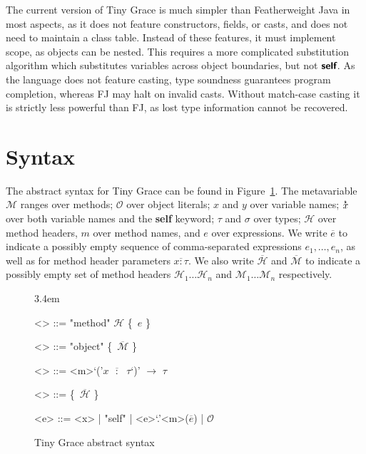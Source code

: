 \documentclass[a4paper, 11pt]{article}
\def\H{\mathcal{H}}
\def\M{\mathcal{M}}
\def\O{\mathcal{O}}
\def\bo{{\sffamily\{}}
\def\bc{{\sffamily\}}}
\newcommand{\self}{\text{\sffamily\bfseries self}}
\def\xs{\overset{_\text{\sffamily\bfseries s}}x}
\begin{document}
\noindent The current version of Tiny Grace is much simpler than Featherweight
Java in most aspects, as it does not feature constructors, fields, or casts, and
does not need to maintain a class table.  Instead of these features, it must
implement scope, as objects can be nested.  This requires a more complicated
substitution algorithm which substitutes variables across object boundaries, but
not $\self$.  As the language does not feature casting, type soundness
guarantees program completion, whereas FJ may halt on invalid casts.  Without
match-case casting it is strictly less powerful than FJ, as lost type
information cannot be recovered.


\section{Syntax}

\def\*#1*{$\overline{#1}$}

The abstract syntax for Tiny Grace can be found in
Figure~\ref{fig:abstract-syntax}.  The metavariable $\M$ ranges over methods;
$\O$ over object literals; $x$ and $y$ over variable names; $\xs$ over both
variable names and the {\sffamily\bfseries self} keyword; $\tau$ and $\sigma$
over types; $\H$ over method headers, $m$ over method names, and $e$ over
expressions.  We write \*e* to indicate a possibly empty sequence of
comma-separated expressions $e_1, \dots, e_n$, as well as for method header
parameters \*x : \tau*.  We also write \*\H* and \*\M* to indicate a possibly
empty set of method headers $\H_1 \dots \H_n$ and $\M_1 \dots \M_n$
respectively.

\begin{figure}
\centering

\def\*#1*{$\overline{\text{#1}}$}
\def\<#1>{$#1$}

\grammarindent3.4em
\renewcommand{\grammarlabel}[2]{$#1$\hfill#2}
\renewcommand{\syntleft}{\itshape}
\renewcommand{\syntright}{}
\renewcommand{\ulitleft}{\sffamily\bfseries}
\renewcommand{\litleft}{\sffamily}
\renewcommand{\litright}{}

\begin{grammar}
<\M> ::= "method" $\H$ \bo~\<e> \bc

<\O> ::= "object" \bo~\*$\M$* \bc

<\H> ::= <m>`('\*\<x> $:$ $\tau$*`)' $\to$ $\tau$

<\tau> ::= \bo~\*$\H$* \bc

<e> ::= <x> | "self" | <e>`.'<m>(\*\<e>*) | $\O$
\end{grammar}

\caption{Tiny Grace abstract syntax}
\label{fig:abstract-syntax}

\end{figure}
\end{document}
